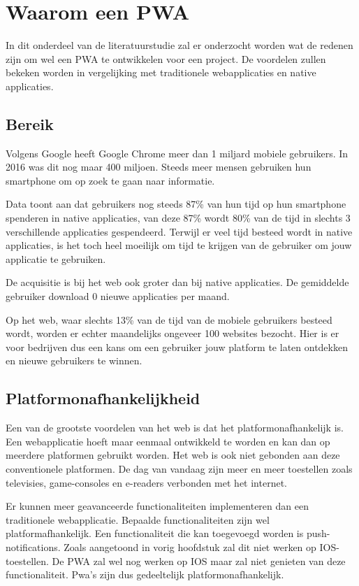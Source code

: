 \section{Waarom een PWA}

In dit onderdeel van de literatuurstudie zal er onderzocht worden wat de redenen zijn om wel een PWA te ontwikkelen voor een project. De voordelen zullen bekeken worden in vergelijking met traditionele webapplicaties en native applicaties.
\autocite{TandelSunil2018}


\subsection{Bereik}
	Volgens Google heeft Google Chrome meer dan 1 miljard mobiele gebruikers. In 2016 was dit nog maar 400 miljoen. Steeds meer mensen gebruiken hun smartphone om op zoek te gaan naar informatie. 
	\autocite{Nath2017}
	
	Data toont aan dat gebruikers nog steeds 87\% van hun tijd op hun smartphone spenderen in native applicaties, van deze 87\% wordt 80\% van de tijd in slechts 3 verschillende applicaties gespendeerd. Terwijl er veel tijd besteed wordt in native applicaties, is het toch heel moeilijk om tijd te krijgen van de gebruiker om jouw applicatie te gebruiken.
	
	De acquisitie is bij het web ook groter dan bij native applicaties. De gemiddelde gebruiker download 0 nieuwe applicaties per maand. 
	
	Op het web, waar slechts 13\% van de tijd van de mobiele gebruikers besteed wordt, worden er echter maandelijks ongeveer 100 websites bezocht. Hier is er voor bedrijven dus een kans om een gebruiker jouw platform te laten ontdekken en nieuwe gebruikers te winnen.
	\autocite{GoogleChromeDevelopers2017}
	

\subsection{Platformonafhankelijkheid }
	Een van de grootste voordelen van het web is dat het platformonafhankelijk is. Een webapplicatie hoeft maar eenmaal ontwikkeld te worden en kan dan op meerdere platformen gebruikt worden. Het web is ook niet gebonden aan deze conventionele platformen. De dag van vandaag zijn meer en meer toestellen zoals televisies, game-consoles en e-readers verbonden met het internet. 
	
	Er kunnen meer geavanceerde functionaliteiten implementeren dan een traditionele webapplicatie. Bepaalde functionaliteiten zijn wel platformafhankelijk. Een functionaliteit die kan toegevoegd worden is push-notifications. Zoals aangetoond in vorig hoofdstuk zal dit niet werken op IOS-toestellen. De PWA zal wel nog werken op IOS maar zal niet genieten van deze functionaliteit. Pwa's zijn dus gedeeltelijk platformonafhankelijk.
	
